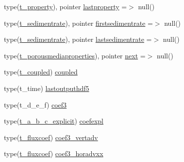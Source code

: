 \begin{DoxyCompactItemize}
\item 
type(\mbox{\hyperlink{structmoduleporousmediaproperties_1_1t__property}{t\+\_\+property}}), pointer \mbox{\hyperlink{structmoduleporousmediaproperties_1_1t__porousmediaproperties_a3c77214874701dc7ee30b7b1e3f6b4d8}{lastproperty}} =$>$ null()
\item 
type(\mbox{\hyperlink{structmoduleporousmediaproperties_1_1t__sedimentrate}{t\+\_\+sedimentrate}}), pointer \mbox{\hyperlink{structmoduleporousmediaproperties_1_1t__porousmediaproperties_a3ac941c32bf6b09ae3f1f883cd1e1b98}{firstsedimentrate}} =$>$ null()
\item 
type(\mbox{\hyperlink{structmoduleporousmediaproperties_1_1t__sedimentrate}{t\+\_\+sedimentrate}}), pointer \mbox{\hyperlink{structmoduleporousmediaproperties_1_1t__porousmediaproperties_a06ac3e8c7ce3393cc4764a36718293ed}{lastsedimentrate}} =$>$ null()
\item 
type(\mbox{\hyperlink{structmoduleporousmediaproperties_1_1t__porousmediaproperties}{t\+\_\+porousmediaproperties}}), pointer \mbox{\hyperlink{structmoduleporousmediaproperties_1_1t__porousmediaproperties_a9d932c95cb1e325a340758e2148f2796}{next}} =$>$ null()
\item 
type(\mbox{\hyperlink{structmoduleporousmediaproperties_1_1t__coupled}{t\+\_\+coupled}}) \mbox{\hyperlink{structmoduleporousmediaproperties_1_1t__porousmediaproperties_a0a852d6b4b77f4edfd0ddea74e41aed0}{coupled}}
\item 
type(t\+\_\+time) \mbox{\hyperlink{structmoduleporousmediaproperties_1_1t__porousmediaproperties_a80c7176260386dac2cb3a90bf03ef613}{lastoutputhdf5}}
\item 
type(t\+\_\+d\+\_\+e\+\_\+f) \mbox{\hyperlink{structmoduleporousmediaproperties_1_1t__porousmediaproperties_af11483d38080c21ca72fc8a3452b6bef}{coef3}}
\item 
type(\mbox{\hyperlink{structmoduleporousmediaproperties_1_1t__a__b__c__explicit}{t\+\_\+a\+\_\+b\+\_\+c\+\_\+explicit}}) \mbox{\hyperlink{structmoduleporousmediaproperties_1_1t__porousmediaproperties_aa352f02c81392c42e8dcd71cc7a13a2d}{coefexpl}}
\item 
type(\mbox{\hyperlink{structmoduleporousmediaproperties_1_1t__fluxcoef}{t\+\_\+fluxcoef}}) \mbox{\hyperlink{structmoduleporousmediaproperties_1_1t__porousmediaproperties_a6b122d760dae5a7b4d82152a515b8337}{coef3\+\_\+vertadv}}
\item 
type(\mbox{\hyperlink{structmoduleporousmediaproperties_1_1t__fluxcoef}{t\+\_\+fluxcoef}}) \mbox{\hyperlink{structmoduleporousmediaproperties_1_1t__porousmediaproperties_a240c7b8db8405d7d42ff31f9453e997f}{coef3\+\_\+horadvxx}}

\end{DoxyCompactItemize}
